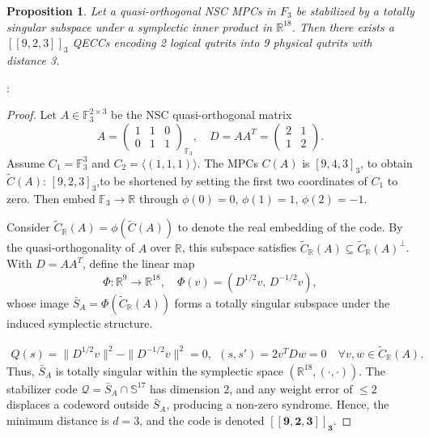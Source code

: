 \documentclass{iopjournal}
\theoremstyle{thmstyleone}%
\newtheorem{proposition}[theorem]{Proposition}
\theoremstyle{thmstyletwo}%
\theoremstyle{thmstylethree}%
\begin{document}
\begin{proposition}
Let a quasi-orthogonal NSC MPCs in $F_3$ be stabilized by a totally singular subspace under a symplectic inner product in  \( \mathbb{R}^{18}\). Then there exists a \([[9,2,3]]_3\)  QECCs encoding 2 logical qutrits into 9 physical qutrits with distance 3.
\end{proposition}:
\begin{proof}
Let $A \in \mathbb{F}_3^{2 \times 3}$ be the NSC quasi-orthogonal matrix
\begin{equation}
A = \begin{pmatrix} 1 & 1 & 0 \\ 0 & 1 & 1 \end{pmatrix}_{\mathbb{F}_3}, \quad
D=AA^T = \begin{pmatrix} 2 & 1 \\ 1 & 2 \end{pmatrix}.\label{matrix}\end{equation}
Assume $C_1 = \mathbb{F}_3^3$ and $C_2 = \langle (1,1,1) \rangle$.  The MPCs $C(A)$ is $[9,4,3]_3$, to obtain $\tilde{C}(A)$: $[9,2,3]_3$,to be  shortened by setting the first two coordinates of $C_1$ to zero. Then embed $\mathbb{F}_3 \to \mathbb{R}$ through $\phi(0)=0$, $\phi(1)=1$, $\phi(2)=-1$. 

Consider $\tilde{C}_{\mathbb{R}}(A) = \phi(\tilde{C}(A))$ to denote the real embedding of the code. By the quasi-orthogonality of $A$ over $\mathbb{R}$, this subspace satisfies 
$\tilde{C}_{\mathbb{R}}(A) \subseteq \tilde{C}_{\mathbb{R}}(A)^{\perp}$. 
With $D = AA^T$, define the linear map
\begin{equation}
\Phi: \mathbb{R}^9 \rightarrow \mathbb{R}^{18}, \quad 
\Phi(v) = (D^{1/2}v,\, D^{-1/2}v),\label{phi v}
\end{equation}
whose image $\bar{S}_A = \Phi(\tilde{C}_{\mathbb{R}}(A))$ 
forms a totally singular subspace under the induced symplectic structure.

\begin{equation}
\begin{aligned}
Q(s) = \|D^{1/2} v\|^2 - \|D^{-1/2} v\|^2 = 0, ~~(s,s') = 2 v^T D w = 0 \quad \forall v,w \in \tilde{C}_{\mathbb{R}}(A).
\end{aligned}
\end{equation}
Thus, $\bar{S}_A$ is totally singular within the symplectic space 
$(\mathbb{R}^{18}, (\cdot,\cdot))$. 
The stabilizer code $\mathcal{Q} = \bar{S}_A \cap \mathbb{S}^{17}$ 
has dimension $2$, and any weight error of $\leq 2$ 
displaces a codeword outside $\bar{S}_A$, producing a non-zero syndrome. Hence, the minimum distance is $d=3$, and the code is denoted 
$\mathbf{[[9,2,3]]_3}$.
\end{proof}
\end{document}

